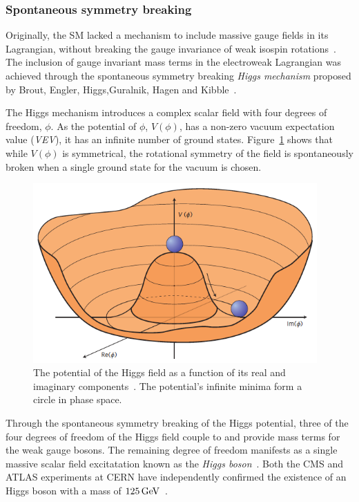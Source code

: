 \subsubsection{Spontaneous symmetry breaking}\label{subsec:higgs}
Originally, the SM lacked a mechanism to include massive gauge fields in its Lagrangian, without breaking the gauge invariance of weak isospin rotations~\cite{Griffiths}.
The inclusion of gauge invariant mass terms in the electroweak Lagrangian was achieved through the spontaneous symmetry breaking \emph{Higgs mechanism} proposed by Brout, Engler, Higgs,Guralnik, Hagen and Kibble~\cite{Englert:1964et,Higgs:1964pj,Guralnik:1964eu}.

The Higgs mechanism introduces a complex scalar field with four degrees of freedom, $\phi$.
As the potential of $\phi$, $V(\phi)$, has a non-zero vacuum expectation value (\textit{VEV}), it has an infinite number of ground states.
Figure~\ref{fig:higgsPotential} shows that while $V(\phi)$ is symmetrical, the rotational symmetry of the field is spontaneously broken when a single ground state for the vacuum is chosen.

\begin{figure}[htbp]
\begin{center}
\includegraphics[width=0.97\textwidth]{figs/sm/higgspotential.png}
\caption{The potential of the Higgs field as a function of its real and imaginary components~\cite{Ellis:2013jnq}. The potential's infinite minima form a circle in phase space.}
\label{fig:higgsPotential}
\end{center}
\end{figure}

Through the spontaneous symmetry breaking of the Higgs potential, three of the four degrees of freedom of the Higgs field couple to and provide mass terms for the weak gauge bosons.
The remaining degree of freedom manifests as a single massive scalar field excitatation known as the \emph{Higgs boson}~\cite{Cheng:1985bj}.
Both the CMS and ATLAS experiments at CERN have independently confirmed the existence of an  Higgs boson with a mass of $125\,\text{Ge\hspace{-.08em}V}$~\cite{HiggsCMS,HiggsATLAS}. 

